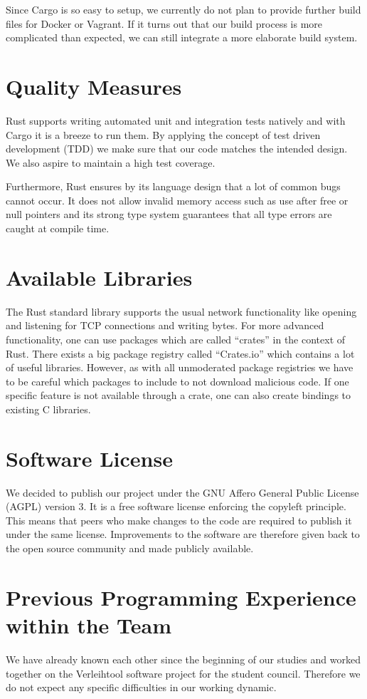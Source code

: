 \documentclass[a4paper, 11pt]{article}
\begin{document}
Since Cargo is so easy to setup, we currently do not plan to provide further build files for Docker or Vagrant. If it turns out that our build process is more complicated than expected, we can still integrate a more elaborate build system.

\section*{Quality Measures}
Rust supports writing automated unit and integration tests natively and with Cargo it is a breeze to run them. By applying the concept of test driven development (TDD) we make sure that our code matches the intended design. We also aspire to maintain a high test coverage.

Furthermore, Rust ensures by its language design that a lot of common bugs cannot occur. It does not allow invalid memory access such as use after free or null pointers and its strong type system guarantees that all type errors are caught at compile time.

\section*{Available Libraries}
The Rust standard library supports the usual network functionality like opening and listening for TCP connections and writing bytes. For more advanced functionality, one can use packages which are called ``crates'' in the context of Rust. There exists a big package registry called ``Crates.io'' \cite{Crates} which contains a lot of useful libraries. However, as with all unmoderated package registries we have to be careful which packages to include to not download malicious code. If one specific feature is not available through a crate, one can also create bindings to existing C libraries.

\section*{Software License}
We decided to publish our project under the GNU Affero General Public License (AGPL) version 3. \cite{AGPL} It is a free software license enforcing the copyleft principle. This means that peers who make changes to the code are required to publish it under the same license. Improvements to the software are therefore given back to the open source community and made publicly available. 

\section*{Previous Programming Experience within the Team}
We have already known each other since the beginning of our studies and worked together on the Verleihtool \cite{verleihtool}  software project for the student council. Therefore we do not expect any specific difficulties in our working dynamic. 
\end{document}
